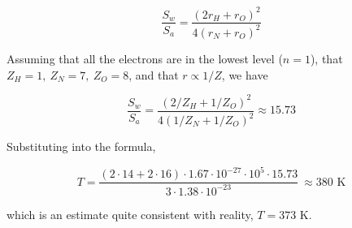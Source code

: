 \documentclass[11pt]{article}
\begin{document}
\begin{pproblem}
\begin{pssolution*}{}{}
\begin{alternativas}
    \[\frac{S_w}{S_a} = \frac{(2r_H + r_O)^2}{4(r_N + r_O)^2}\]

    Assuming that all the electrons are in the lowest level (\(n=1\)), that \(Z_H = 1, \ Z_N = 7, \ Z_O = 8\), and that \(r\propto 1/Z\), we have
    
    \[\boxed{\frac{S_w}{S_a}=\frac{(2/Z_H + 1/Z_O)^2}{4(1/Z_N + 1/Z_O)^2} \approx 15.73}\]

    \item Substituting into the formula,

    \[T = \frac{(2\cdot 14 + 2 \cdot 16) \cdot 1.67 \cdot 10^{-27} \cdot 10^{5} \cdot 15.73}{3 \cdot 1.38\cdot 10^{-23}} \ \boxed{\approx 380\text{ K}}\]

    which is an estimate quite consistent with reality, \(T = 373\) K.
\end{alternativas}
    

    

    
    
\end{pssolution*}
\end{pproblem}
\end{document}
